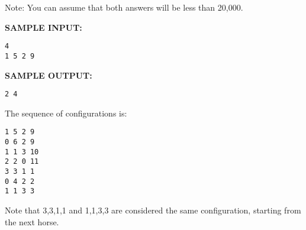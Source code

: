 \documentclass[twoside]{article}
\newcommand{\blank}{\vskip 3mm}
\begin{document}
Note: You can assume that both answers will be less than 20,000.

\blank
\textbf{SAMPLE INPUT:}
\begin{verbatim}
4
1 5 2 9
\end{verbatim}


\textbf{SAMPLE OUTPUT:}
\begin{verbatim}
2 4
\end{verbatim}

The sequence of configurations is:
\begin{verbatim}
1 5 2 9 
0 6 2 9
1 1 3 10
2 2 0 11
3 3 1 1
0 4 2 2
1 1 3 3
\end{verbatim}
Note that 3,3,1,1 and 1,1,3,3 are considered the same configuration, starting from the next horse.
\end{document}
